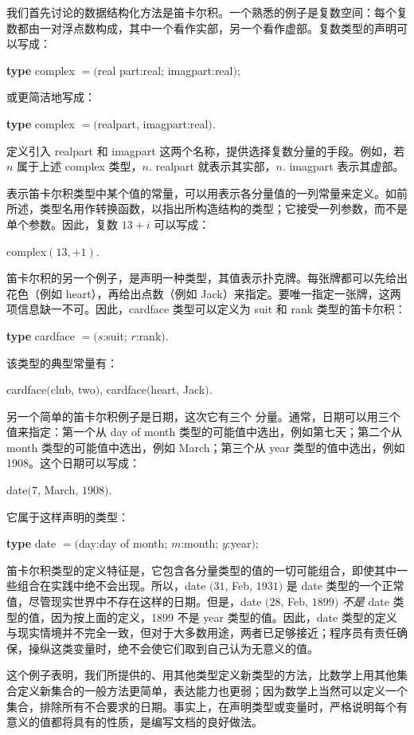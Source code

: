 \documentclass[twoside,11pt,fontset=none]{ctexbook}
\begin{document}
我们首先讨论的数据结构化方法是笛卡尔积。一个熟悉的例子是复数空间：每个复数都由一对浮点数构成，其中一个看作实部，另一个看作虚部。复数类型的声明可以写成：

\quad \textbf{type} complex $= ($real part:real; imagpart:real$)$;
\nopagebreak

\noindent
或更简洁地写成：
\nopagebreak

\quad \textbf{type} complex $= ($realpart, imagpart:real$)$.

定义引入 realpart 和 imagpart 这两个名称，提供选择复数分量的手段。例如，若 $n$ 属于上述 complex 类型，$n$. realpart 就表示其实部，$n$. imagpart 表示其虚部。

表示笛卡尔积类型中某个值的常量，可以用表示各分量值的一列常量来定义。如前所述，类型名用作转换函数，以指出所构造结构的类型；它接受一列参数，而不是单个参数。因此，复数 $13 + i$ 可以写成：

\quad complex$(13, + 1)$.

\noindent
笛卡尔积的另一个例子，是声明一种类型，其值表示扑克牌。每张牌都可以先给出花色（例如 heart），再给出点数（例如 Jack）来指定。要唯一指定一张牌，这两项信息缺一不可。因此，cardface 类型可以定义为 suit 和 rank 类型的笛卡尔积：

\quad \textbf{type} cardface $= (s$:suit; $r$:rank$)$.

该类型的典型常量有：

\quad cardface$($club, two$)$, cardface$($heart, Jack$)$.

另一个简单的笛卡尔积例子是日期，这次它有三个
分量。通常，日期可以用三个
值来指定：第一个从 day of
month 类型的可能值中选出，例如第七天；第二个从
month 类型的可能值中选出，例如 March；第三个从
year 类型的值中选出，例如 1908。这个日期可以写成：

\quad date$(7$, March, $1908)$.

\noindent
它属于这样声明的类型：

\quad \textbf{type} date $= ($day:day of month; $m$:month; $y$:year$)$;

笛卡尔积类型的定义特征是，它包含各分量类型的值的一切可能组合，即使其中一些组合在实践中绝不会出现。所以，date $(31$, Feb, $1931)$ 是 date 类型的一个正常值，尽管现实世界中不存在这样的日期。但是，date $(28$, Feb, $1899)$ \textit{不是} date 类型的值，因为按上面的定义，1899 不是 year 类型的值。因此，date 类型的定义与现实情境并不完全一致，但对于大多数用途，两者已足够接近；程序员有责任确保，操纵这类变量时，绝不会使它们取到自己认为无意义的值。

这个例子表明，我们所提供的、用其他类型定义新类型的方法，比数学上用其他集合定义新集合的一般方法更简单，表达能力也更弱；因为数学上当然可以定义一个集合，排除所有不合要求的日期。事实上，在声明类型或变量时，严格说明每个有意义的值都将具有的性质，是编写文档的良好做法。
 
\end{document}

